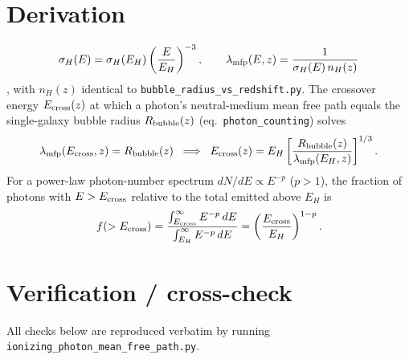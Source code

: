 \documentclass[11pt,a4paper]{article}
\newcommand{\lmfp}{\lambda_{\rm mfp}}
\begin{document}
\section{Derivation}
\label{sec:derivation}

\begin{equation}
  \sigma_H(E) = \sigma_H(E_H)\left(\frac{E}{E_H}\right)^{-3}, \qquad
  \lmfp(E,z) = \frac{1}{\sigma_H(E)\,n_H(z)}
  \label{eq:mfp}
\end{equation}
\citep[eq.~46]{Choudhury2022}, with $n_H(z)$ identical to \texttt{bubble\_radius\_vs\_redshift.py}. The
crossover energy $E_{\rm cross}(z)$ at which a photon's neutral-medium mean free path equals the
single-galaxy bubble radius $R_{\rm bubble}(z)$ (eq.~\texttt{photon\_counting}) solves
\begin{equation}
  \lmfp(E_{\rm cross},z) = R_{\rm bubble}(z)
  \;\;\Longrightarrow\;\;
  E_{\rm cross}(z) = E_H\left[\frac{R_{\rm bubble}(z)}{\lmfp(E_H,z)}\right]^{1/3}.
  \label{eq:Ecross}
\end{equation}
For a power-law photon-number spectrum $dN/dE\propto E^{-p}$ ($p>1$), the fraction of photons with
$E>E_{\rm cross}$ relative to the total emitted above $E_H$ is
\begin{equation}
  f(>E_{\rm cross}) = \frac{\int_{E_{\rm cross}}^\infty E^{-p}\,dE}{\int_{E_H}^\infty E^{-p}\,dE}
  = \left(\frac{E_{\rm cross}}{E_H}\right)^{1-p}.
  \label{eq:fraction}
\end{equation}

\section{Verification / cross-check}
\label{sec:verification}

All checks below are reproduced verbatim by running \texttt{ionizing\_photon\_mean\_free\_path.py}.
\end{document}
